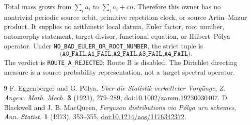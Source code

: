 \documentclass[10pt]{article}
\begin{document}
Total mass grows from $\sum_i a_i$ to $\sum_i a_i+cn$.  Therefore this owner
has no nontrivial periodic source orbit, primitive repetition clock, or source
Artin--Mazur product.  It supplies no arithmetic local datum, Euler factor,
root number, automorphy statement, target divisor, functional equation, or
Hilbert--P\'olya operator.  Under
\texttt{NO\_BAD\_EULER\_OR\_ROOT\_NUMBER}, the strict tuple is
\[
 \texttt{(A0\_FAIL,A1\_FAIL,A2\_FAIL,A3\_FAIL,A4\_FAIL)}.
\]
The verdict is \texttt{ROUTE\_A\_REJECTED}; Route B is disabled.  The
Dirichlet directing measure is a source probability representation, not a
target spectral operator.

\begin{thebibliography}{9}
 F. Eggenberger and G. P\'olya,
\emph{\"Uber die Statistik verketteter Vorg\"ange},
\emph{Z. Angew. Math. Mech.} \textbf{3} (1923), 279--289,
\href{https://doi.org/10.1002/zamm.19230030407}{doi:10.1002/zamm.19230030407}.
 D. Blackwell and J. B. MacQueen,
\emph{Ferguson distributions via P\'olya urn schemes},
\emph{Ann. Statist.} \textbf{1} (1973), 353--355,
\href{https://doi.org/10.1214/aos/1176342372}{doi:10.1214/aos/1176342372}.
\end{thebibliography}
\end{document}
